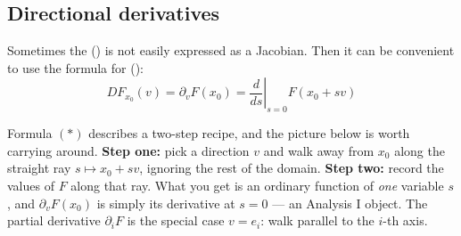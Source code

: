 \subsection{Directional derivatives}

Sometimes the  () is not easily expressed as a
Jacobian. Then it can be convenient to use the formula for 
():
\begin{equation*}
DF_{x_0}(v) = \partial_v F(x_0) = \left.\frac{d}{ds}\right|_{s=0} F(x_0 + sv) \tag{$*$}
\end{equation*}

Formula $(*)$ describes a two-step recipe, and the picture below is worth carrying around.
\textbf{Step one:} pick a direction $v$ and walk away from $x_0$ along the straight ray
$s \mapsto x_0+sv$, ignoring the rest of the domain. \textbf{Step two:} record the values of $F$
along that ray. What you get is an ordinary function of \emph{one} variable $s$, and
$\partial_vF(x_0)$ is simply its derivative at $s=0$ --- an Analysis I object. The partial
derivative $\partial_iF$ is the special case $v = e_i$: walk parallel to the $i$-th axis.

